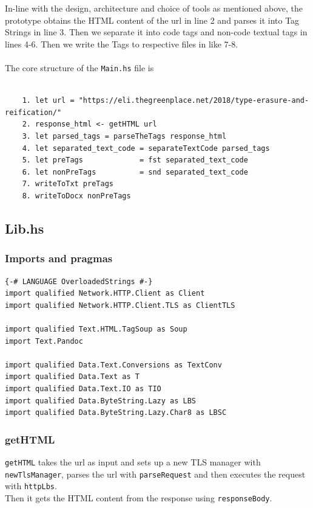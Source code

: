 \documentclass{scrreprt}
\begin{document}
In-line with the design, architecture and choice of tools as mentioned above, the prototype obtains the HTML content of the url in line 2 and parses it into Tag Strings in line 3. Then we separate it into code tags and non-code textual tags in lines 4-6. Then we write the Tags to respective files in like 7-8.\\
\\ The core structure of the \texttt{Main.hs} file is
\begin{verbatim}

    1. let url = "https://eli.thegreenplace.net/2018/type-erasure-and-reification/"
    2. response_html <- getHTML url
    3. let parsed_tags = parseTheTags response_html
    4. let separated_text_code = separateTextCode parsed_tags
    5. let preTags             = fst separated_text_code
    6. let nonPreTags          = snd separated_text_code
    7. writeToTxt preTags
    8. writeToDocx nonPreTags

\end{verbatim}

\subsection{Lib.hs}

\subsubsection{Imports and pragmas}

\begin{verbatim}
{-# LANGUAGE OverloadedStrings #-}
import qualified Network.HTTP.Client as Client
import qualified Network.HTTP.Client.TLS as ClientTLS

import qualified Text.HTML.TagSoup as Soup
import Text.Pandoc

import qualified Data.Text.Conversions as TextConv
import qualified Data.Text as T
import qualified Data.Text.IO as TIO
import qualified Data.ByteString.Lazy as LBS
import qualified Data.ByteString.Lazy.Char8 as LBSC

\end{verbatim}

\subsubsection{getHTML}
\texttt{getHTML} takes the url as input and sets up a new TLS manager with \texttt{newTlsManager}, parses the url with \texttt{parseRequest} and then executes the request with \texttt{httpLbs}. \\ Then it gets the HTML content from the response using \texttt{responseBody}.
\end{document}
